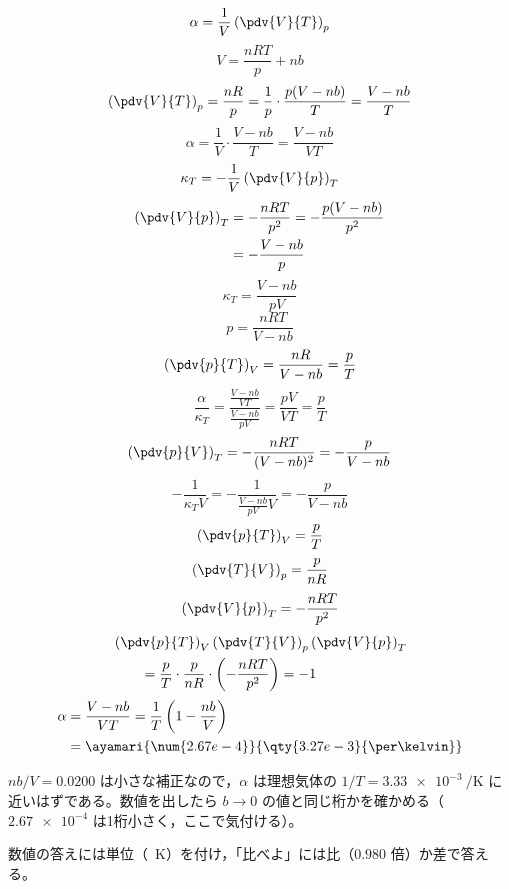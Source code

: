 \[ \alpha=\frac{1}{V}\left(\pdv{V}{T}\right)_{p} \]
\[ V=\frac{nRT}{p}+nb \]
\[ \left(\pdv{V}{T}\right)_{p}=\frac{nR}{p}=\frac{1}{p}\cdot\frac{p(V-nb)}{T}=\frac{V-nb}{T} \]
\[ \alpha=\frac{1}{V}\cdot\frac{V-nb}{T}=\frac{V-nb}{VT} \]
\[ \kappa_{T}=-\frac{1}{V}\left(\pdv{V}{p}\right)_{T} \]
\begin{align*}
\left(\pdv{V}{p}\right)_{T}&=-\frac{nRT}{p^{2}}=-\frac{p(V-nb)}{p^{2}}\\
&=-\frac{V-nb}{p}
\end{align*}
\[ \kappa_{T}=\frac{V-nb}{pV} \]
\[ p=\frac{nRT}{V-nb} \]
\[ \left(\pdv{p}{T}\right)_{V}=\frac{nR}{V-nb}=\frac{p}{T} \]
\[ \frac{\alpha}{\kappa_{T}}=\frac{\frac{V-nb}{VT}}{\frac{V-nb}{pV}}=\frac{pV}{VT}=\frac{p}{T} \]
\[ \left(\pdv{p}{V}\right)_{T}=-\frac{nRT}{(V-nb)^{2}}=-\frac{p}{V-nb} \]
\[ -\frac{1}{\kappa_{T}V}=-\frac{1}{\frac{V-nb}{pV}V}=-\frac{p}{V-nb} \]
\[ \left(\pdv{p}{T}\right)_{V}=\frac{p}{T} \]
\[ \left(\pdv{T}{V}\right)_{p}=\frac{p}{nR} \]
\[ \left(\pdv{V}{p}\right)_{T}=-\frac{nRT}{p^{2}} \]
\begin{align*}
&\left(\pdv{p}{T}\right)_{V}\left(\pdv{T}{V}\right)_{p}\left(\pdv{V}{p}\right)_{T}\\
&\qquad=\frac{p}{T}\cdot\frac{p}{nR}\cdot\left(-\frac{nRT}{p^{2}}\right)=-1
\end{align*}
\begin{align*}
\alpha&=\frac{V-nb}{VT}=\frac{1}{T}\left(1-\frac{nb}{V}\right)\\
&=\ayamari{\num{2.67e-4}}{\qty{3.27e-3}{\per\kelvin}}
\end{align*}
\item $nb/V=0.0200$ は小さな補正なので，$\alpha$ は理想気体の $1/T=\qty{3.33e-3}{\per\kelvin}$ に近いはずである。数値を出したら $b\to0$ の値と同じ桁かを確かめる（$\num{2.67e-4}$ は1桁小さく，ここで気付ける）。
\item 数値の答えには単位（\unit{\per\kelvin}）を付け，「比べよ」には比（$0.980$ 倍）か差で答える。
